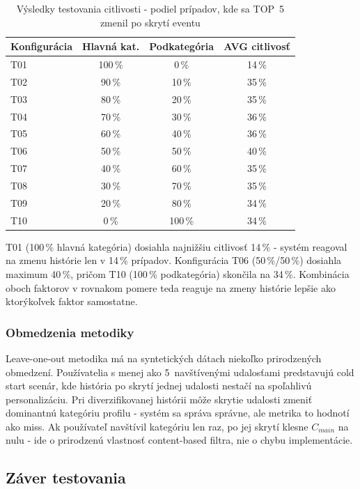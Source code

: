 \begin{table}[H]
\centering
\begin{tabular}{|l|c|c|c|}
\hline
\textbf{Konfigurácia} & \textbf{Hlavná kat.} & \textbf{Podkategória} & \textbf{AVG citlivosť} \\
\hline
T01 & 100\,\% & 0\,\%   & 14\,\% \\
T02 & 90\,\%  & 10\,\%  & 35\,\% \\
T03 & 80\,\%  & 20\,\%  & 35\,\% \\
T04 & 70\,\%  & 30\,\%  & 36\,\% \\
T05 & 60\,\%  & 40\,\%  & 36\,\% \\
T06 & 50\,\%  & 50\,\%  & 40\,\% \\
T07 & 40\,\%  & 60\,\%  & 35\,\% \\
T08 & 30\,\%  & 70\,\%  & 35\,\% \\
T09 & 20\,\%  & 80\,\%  & 34\,\% \\
T10 & 0\,\%   & 100\,\% & 34\,\% \\
\hline
\end{tabular}
\caption{Výsledky testovania citlivosti - podiel prípadov, kde sa TOP~5 zmenil po skrytí eventu}
\label{tab:sensitivity}
\end{table}

T01 (100\,\% hlavná kategória) dosiahla najnižšiu citlivosť 14\,\% - systém
reagoval na zmenu histórie len v 14\,\% prípadov. Konfigurácia T06 (50\,\%/50\,\%)
dosiahla maximum 40\,\%, pričom T10 (100\,\% podkategória) skončila na 34\,\%.
Kombinácia oboch faktorov v rovnakom pomere teda reaguje na zmeny histórie lepšie
ako ktorýkoľvek faktor samostatne.

\subsubsection{Obmedzenia metodiky}

Leave-one-out metodika má na syntetických dátach niekoľko prirodzených obmedzení.
Používatelia s menej ako 5~navštívenými udalosťami predstavujú cold start scenár,
kde história po skrytí jednej udalosti nestačí na spoľahlivú personalizáciu.
Pri diverzifikovanej histórii môže skrytie udalosti zmeniť dominantnú kategóriu
profilu - systém sa správa správne, ale metrika to hodnotí ako miss. Ak používateľ
navštívil kategóriu len raz, po jej skrytí klesne $C_{main}$ na nulu - ide o
prirodzenú vlastnosť content-based filtra, nie o chybu implementácie.

\subsection{Záver testovania}

